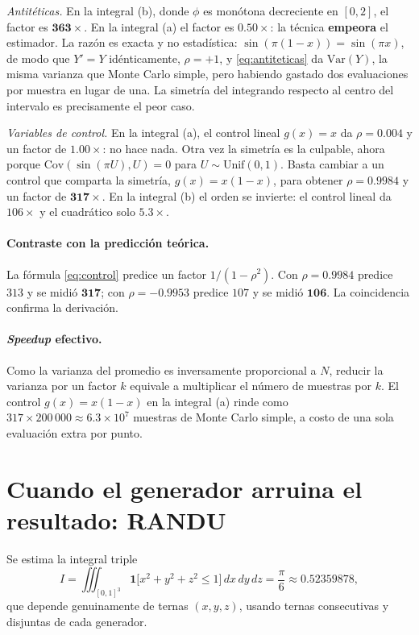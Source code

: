 \emph{Antitéticas.} En la integral (b), donde $\phi$ es monótona decreciente en
$[0,2]$, el factor es $\mathbf{363\times}$. En la integral (a) el factor es
$\mathbf{0.50\times}$: la técnica \textbf{empeora} el estimador. La razón es
exacta y no estadística: $\sin(\pi(1-x)) = \sin(\pi x)$, de modo que
$Y' = Y$ idénticamente, $\rho = +1$, y \eqref{eq:antiteticas} da
$\mathrm{Var}(Y)$, la misma varianza que Monte Carlo simple, pero habiendo
gastado dos evaluaciones por muestra en lugar de una. La simetría del
integrando respecto al centro del intervalo es precisamente el peor caso.

\emph{Variables de control.} En la integral (a), el control lineal $g(x)=x$ da
$\rho = 0.004$ y un factor de $1.00\times$: no hace nada. Otra vez la simetría
es la culpable, ahora porque $\mathrm{Cov}(\sin(\pi U), U) = 0$ para
$U\sim\mathrm{Unif}(0,1)$. Basta cambiar a un control que comparta la simetría,
$g(x) = x(1-x)$, para obtener $\rho = 0.9984$ y un factor de
$\mathbf{317\times}$. En la integral (b) el orden se invierte: el control
lineal da $106\times$ y el cuadrático solo $5.3\times$.

\paragraph{Contraste con la predicción teórica.} La fórmula \eqref{eq:control}
predice un factor $1/(1-\rho^2)$. Con $\rho = 0.9984$ predice $313$ y se midió
$\mathbf{317}$; con $\rho = -0.9953$ predice $107$ y se midió $\mathbf{106}$.
La coincidencia confirma la derivación.

\paragraph{\emph{Speedup} efectivo.} Como la varianza del promedio es
inversamente proporcional a $N$, reducir la varianza por un factor $k$ equivale
a multiplicar el número de muestras por $k$. El control $g(x)=x(1-x)$ en la
integral (a) rinde como $317 \times 200\,000 \approx 6.3\times 10^{7}$ muestras
de Monte Carlo simple, a costo de una sola evaluación extra por punto.

\section{Cuando el generador arruina el resultado: RANDU}
\label{sec:mc-randu}

Se estima la integral triple
\[
  I = \iiint_{[0,1]^3} \mathbf{1}\bigl[x^2+y^2+z^2 \le 1\bigr]\,dx\,dy\,dz
  = \frac{\pi}{6} \approx 0.52359878,
\]
que depende genuinamente de ternas $(x,y,z)$, usando ternas consecutivas y
disjuntas de cada generador.

